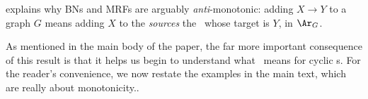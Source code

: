 \begin{subappendices}
 explains why BNs and MRFs are arguably \emph{anti}-monotonic: adding $X \to Y$ to a graph $G$ means adding $X$ to the \emph{sources} the \arc\ whose target is $Y$, 
in $\Ar_G$.
%

As mentioned in the main body of the paper, 
the far more important consequence of this result is that it
helps us begin to understand what \scibility\ means for cyclic \hgraph s.
For the reader's convenience, we now restate the examples in the main text,
which are really about monotonicity..


\end{subappendices}
